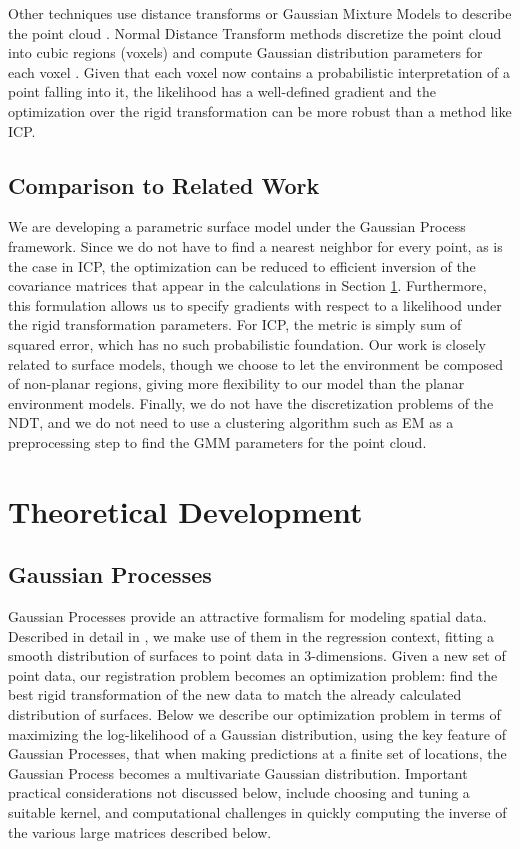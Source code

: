 \documentclass{article} %
\begin{document}
Other techniques use distance transforms or Gaussian Mixture Models to describe the point cloud\cite{tsin2004correlation} \cite{jian2005robust}. Normal Distance Transform methods discretize the point cloud into cubic regions (voxels) and compute Gaussian distribution parameters for each voxel \cite{biber2003normal}. Given that each voxel now contains a probabilistic interpretation of a point falling into it, the likelihood has a well-defined gradient and the optimization over the rigid transformation can be more robust than a method like ICP.

\subsection{Comparison to Related Work}

We are developing a parametric surface model under the Gaussian Process framework. Since we do not have to find a nearest neighbor for every point, as is the case in ICP, the optimization can be reduced to efficient inversion of the covariance matrices that appear in the calculations in Section \ref{sec:math}. Furthermore, this formulation allows us to specify gradients with respect to a likelihood under the rigid transformation parameters. For ICP, the metric is simply sum of squared error, which has no such probabilistic foundation. Our work is closely related to surface models, though we choose to let the environment be composed of non-planar regions, giving more flexibility to our model than the planar environment models. Finally, we do not have the discretization problems of the NDT, and we do not need to use a clustering algorithm such as EM as a preprocessing step to find the GMM parameters for the point cloud. 


\section{Theoretical Development}
\label{sec:math}

\subsection{Gaussian Processes}
Gaussian Processes provide an attractive formalism for modeling spatial data. Described in detail in \cite{rasmussen2006gaussian}, we make use of
them in the regression context, fitting a smooth distribution of surfaces to point data in 3-dimensions. Given a new set of point data, our registration problem becomes an optimization problem: find the best rigid transformation of the new data to match the already calculated distribution of surfaces. Below we describe our optimization problem in terms of
maximizing the log-likelihood of a Gaussian distribution, using the key feature of Gaussian Processes, that when making predictions at
a finite set of locations, the Gaussian Process becomes a multivariate Gaussian distribution. Important practical considerations not discussed below, include choosing and tuning a suitable kernel, and computational challenges in quickly computing the inverse of the various large matrices described below.
\end{document}
